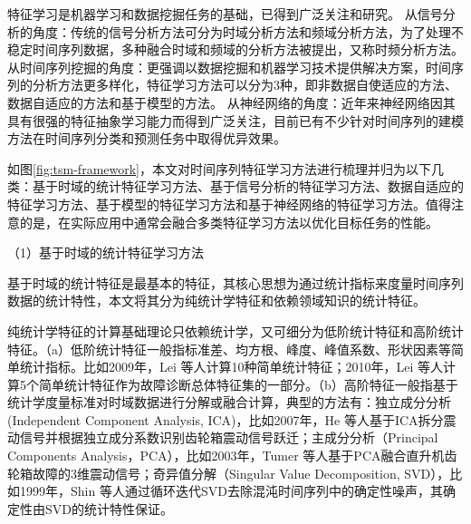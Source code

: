 特征学习是机器学习和数据挖掘任务的基础，已得到广泛关注和研究\cite{guyon2008feature,storcheus2015survey}。
从信号分析的角度：传统的信号分析方法可分为时域分析方法和频域分析方法，为了处理不稳定时间序列数据，多种融合时域和频域的分析方法被提出，又称时频分析方法。
从时间序列挖掘的角度：更强调以数据挖掘和机器学习技术提供解决方案，时间序列的分析方法更多样化，特征学习方法可以分为3种，即非数据自使适应的方法、数据自适应的方法和基于模型的方法。
从神经网络的角度：近年来神经网络因其具有很强的特征抽象学习能力而得到广泛关注，目前已有不少针对时间序列的建模方法在时间序列分类和预测任务中取得优异效果\cite{lecun2015deep,langkvist2014review}。

如图\ref{fig:tsm-framework}，本文对时间序列特征学习方法进行梳理并归为以下几类：基于时域的统计特征学习方法、基于信号分析的特征学习方法、数据自适应的特征学习方法、基于模型的特征学习方法和基于神经网络的特征学习方法。值得注意的是，在实际应用中通常会融合多类特征学习方法以优化目标任务的性能。

（1）基于时域的统计特征学习方法

基于时域的统计特征是最基本的特征，其核心思想为通过统计指标来度量时间序列数据的统计特性，本文将其分为纯统计学特征和依赖领域知识的统计特征。

纯统计学特征的计算基础理论只依赖统计学，又可细分为低阶统计特征和高阶统计特征。（a）低阶统计特征一般指标准差、均方根、峰度、峰值系数、形状因素等简单统计指标。比如2009年，Lei 等人计算10种简单统计特征\cite{lei2009gear}；2010年，Lei 等人计算5个简单统计特征作为故障诊断总体特征集的一部分\cite{lei2010multidimensional}。（b）高阶特征一般指基于统计学度量标准对时域数据进行分解或融合计算，典型的方法有：独立成分分析(Independent Component Analysis, ICA)，比如2007年，He 等人基于ICA拆分震动信号并根据独立成分系数识别齿轮箱震动信号跃迁\cite{he2007detection}；主成分分析（Principal Components Analysis，PCA），比如2003年，Tumer 等人基于PCA融合直升机齿轮箱故障的3维震动信号\cite{tumer2003analysis}；奇异值分解（Singular Value Decomposition, SVD），比如1999年，Shin 等人通过循环迭代SVD去除混沌时间序列中的确定性噪声，其确定性由SVD的统计特性保证\cite{shin1999iterative}。

